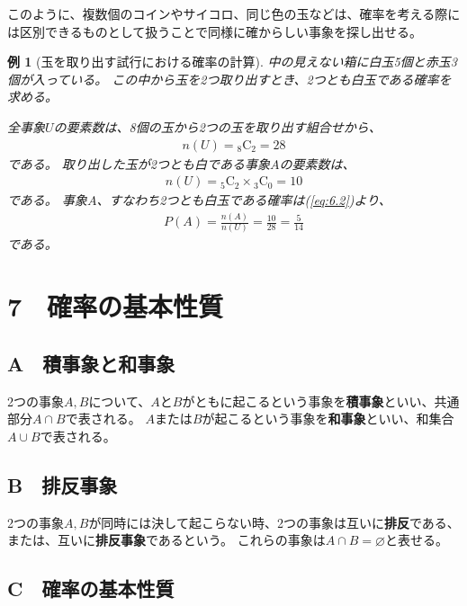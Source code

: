 \documentclass[luatexja,fontsize=12pt]{jlreq}\usepackage{ifthen}\newcounter{enlarge}\setcounter{enlarge}{1}
\newtheorem{eg}{例}
\begin{document}
このように、複数個のコインやサイコロ、同じ色の玉などは、確率を考える際には区別できるものとして扱うことで同様に確からしい事象を探し出せる。

\begin{eg}[玉を取り出す試行における確率の計算]
中の見えない箱に白玉5個と赤玉3個が入っている。
この中から玉を2つ取り出すとき、2つとも白玉である確率を求める。

全事象$U$の要素数は、8個の玉から2つの玉を取り出す組合せから、
\begin{align} \label{eq:6.5}
n(U) = {}_8 \mathrm{C}_2 = 28 
\end{align}
である。
取り出した玉が2つとも白である事象$A$の要素数は、
\begin{align} \label{eq:6.6}
n(U) = {}_5 \mathrm{C}_2 \times {}_3 \mathrm{C}_0 = 10 
\end{align}
である。
事象$A$、すなわち2つとも白玉である確率は(\ref{eq:6.2})より、
\begin{align} \label{eq:6.7}
P(A) = \frac{n(A)}{n(U)} = \frac{10}{28} = \frac{5}{14}
\end{align}
である。
\end{eg}

\section*{7　確率の基本性質}

\subsection*{A　積事象と和事象}

2つの事象$A, B$について、$A$と$B$がともに起こるという事象を\textbf{積事象}といい、共通部分$A \cap B$で表される。
$A$または$B$が起こるという事象を\textbf{和事象}といい、和集合$A \cup B$で表される。

\subsection*{B　排反事象}

2つの事象$A, B$が同時には決して起こらない時、2つの事象は互いに\textbf{排反}である、または、互いに\textbf{排反事象}であるという。
これらの事象は$A \cap B = \varnothing$と表せる。

\subsection*{C　確率の基本性質}
\end{document}
